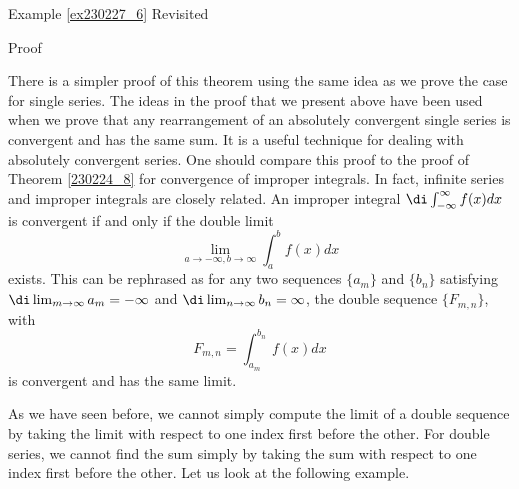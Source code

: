 \begin{example}{\linkt Example \ref{ex230227_6} Revisited}
\begin{example}[label=ex230227_13]{}
\begin{example}{}
\begin{myproof}{Proof}
\end{myproof}There is a simpler proof of this theorem using the same idea as we prove the case for single series. The ideas in the proof that we present above have been used when we prove that any rearrangement of an absolutely convergent single series is convergent and has the same sum. It is a useful technique  for dealing with absolutely convergent series. One should compare this proof to the proof of Theorem \ref{230224_8} for convergence of improper integrals. In fact, infinite series and improper integrals are closely related. An improper integral $\di\int_{-\infty}^{\infty} f(x)dx$ is convergent if and only if the double limit
\[\lim_{a\to-\infty, b\to\infty}\int_a^bf(x)dx\] exists. This can be rephrased as for any two sequences $\{a_m\}$ and $\{b_n\}$ satisfying   $\di\lim_{m\to\infty}a_m=-\infty$ and $\di\lim_{n\to \infty}b_n=\infty$, the double sequence $\{F_{m,n}\}$, with 
\[F_{m,n}=\int_{a_m}^{b_n}f(x)dx\] is convergent and has the same limit.

As we have seen before, we cannot simply compute the limit of a double sequence by taking the limit with respect to one index first before the other. For double series, we cannot find the sum simply by taking the sum with respect to one index first before the other. Let us look at the following example.
\end{example}
\end{example}
\end{example}

